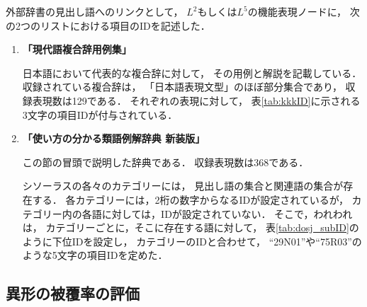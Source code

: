 \documentclass[japanese]{jnlp_1.3e}
\begin{document}
\begin{table}[b]

\end{table}

\begin{table}[t]

\end{table}

\begin{table}[t]

\end{table}

\begin{table}[t]

\end{table}

外部辞書の見出し語へのリンクとして，
$L^2$もしくは$L^5$の機能表現ノードに，
次の2つのリストにおける項目のIDを記述した．
\begin{enumerate}
\item {\bf 「現代語複合辞用例集」}

      日本語において代表的な複合辞に対して，
      その用例と解説を記載している．
      収録されている複合辞は，
      「日本語表現文型」のほぼ部分集合であり，
      収録表現数は129である．
      それぞれの表現に対して，
      表\ref{tab:kkkID}に示される3文字の項目IDが付与されている．

\item {\bf 「使い方の分かる類語例解辞典 新装版」}

      この節の冒頭で説明した辞典である．
      収録表現数は368である．

      シソーラスの各々のカテゴリーには，
      見出し語の集合と関連語の集合が存在する．
      各カテゴリーには，2桁の数字からなるIDが設定されているが，
      カテゴリー内の各語に対しては，IDが設定されていない．
      そこで，われわれは，
      カテゴリーごとに，そこに存在する語に対して，
      表\ref{tab:dosj_subID}のように下位IDを設定し，
      カテゴリーのIDと合わせて，
      ``29N01''や``75R03''のような5文字の項目IDを定めた．
\end{enumerate}

\begin{table}[t]

\end{table}

\begin{table}[t]

\end{table}

\subsection{異形の被覆率の評価}
\end{document}

